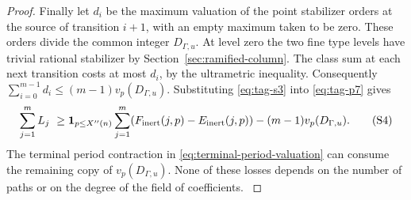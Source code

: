 \begin{proof}
Finally let \(d_i\) be the maximum valuation of the point
stabilizer orders at the source of transition \(i+1\), with an
empty maximum taken to be zero. These orders divide the common
integer \(D_{\Gamma,u}\). At level zero the two fine type levels
have trivial rational stabilizer by
Section~\ref{sec:ramified-column}. 
The class sum at each next
transition costs at most \(d_i\), by the ultrametric inequality.
Consequently \(\sum_{i=0}^{m-1}d_i\le(m-1)v_p(D_{\Gamma,u})\).
Substituting \eqref{eq:tag-s3} into \eqref{eq:tag-p7} gives
\[
 \sum_{j=1}^m L_j\ \ge {\bf1}_{p\le X''(n)}\sum_{j=1}^m
      (F_{\rm inert}(j,p)-E_{\rm inert}(j,p))
       -(m-1)v_p(D_{\Gamma,u}).
 \tag{S4}\label{eq:tag-s4}
\]
The terminal period contraction in \eqref{eq:terminal-period-valuation}
can consume the remaining copy of \(v_p(D_{\Gamma,u})\). None
of these losses depends on the number of paths or on the
degree of the field of coefficients. \label{cor:complementary-period-1}
\end{proof}


